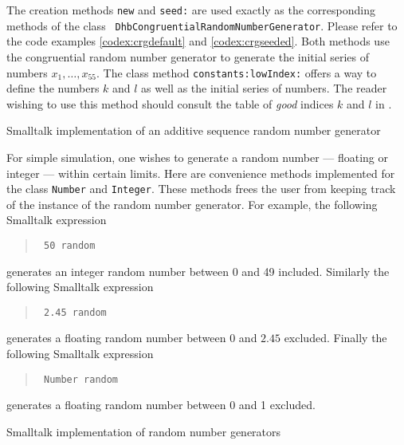 \documentclass[twoside]{book}
\begin{document}
The creation methods {\tt new} and {\tt seed:} are used exactly as
the corresponding methods of the class {\tt
DhbCongruentialRandomNumberGenerator}. Please refer to the code
examples \ref{codex:crgdefault} and \ref{codex:crgseeded}. Both
methods use the congruential random number generator to generate
the initial series of numbers $x_1,\ldots,x_{55}$. The class
method {\tt constants:lowIndex:} offers a way to define the
numbers $k$ and $l$ as well as the initial series of numbers. The
reader wishing to use this method should consult the table of {\sl
good} indices $k$ and $l$ in \cite{Knuth2}.

\begin{listing} Smalltalk implementation of an additive sequence random number generator
\label{ls:randomseq}

\end{listing}

For simple simulation, one wishes to generate a random number ---
floating or integer --- within certain limits. Here are
convenience methods implemented for the class {\tt Number} and
{\tt Integer}. These methods frees the user from keeping track of
the instance of the random number generator. For example, the
following Smalltalk expression
\begin{quote}
\begin{verbatim}
 50 random
\end{verbatim}
\end{quote}
\noindent generates an integer random number between 0 and 49
included. Similarly the following Smalltalk expression
\begin{quote}
\begin{verbatim}
 2.45 random
\end{verbatim}
\end{quote}
\noindent generates a floating random number between 0 and $2.45$
excluded. Finally the following Smalltalk expression
\begin{quote}
\begin{verbatim}
 Number random
\end{verbatim}
\end{quote}
\noindent generates a floating random number between 0 and 1
excluded.
\begin{listing} Smalltalk implementation of random number generators
\label{ls:randomuse}


\end{listing}
\end{document}
